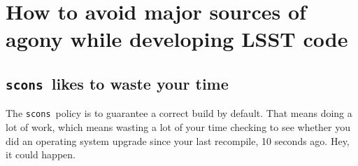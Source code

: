 
\newcommand{\code}[1]{\texttt{#1}}
\newcommand{\scons}{\code{scons}}
\newcommand{\make}{\code{make}}

\newcommand{\heading}[1]{\paragraph{#1}\rule{0pt}{0pt}}

\newenvironment{codesize}
               {\begin{small}}
               {\end{small}}

\newenvironment{transcript}%
               {%
                 \vspace{4pt}\par\noindent%
                 \rule{4pt}{4pt}\hspace{1cm}%
                 \begin{minipage}[t]{0.8\textwidth}%
                   \begin{codesize}%
                     \tt}%
               {%
                   \end{codesize}%
                 \end{minipage}%
                 \noindent\ignorespacesafterend\vspace{8pt}\par}

\section{How to avoid major sources of agony while developing LSST code}

\subsection{\scons\ likes to waste your time}

The \scons\ policy is to guarantee a correct build by default.  That
means doing a lot of work, which means wasting a lot of your time
checking to see whether you did an operating system upgrade since your
last recompile, 10 seconds ago.  Hey, it could happen.


